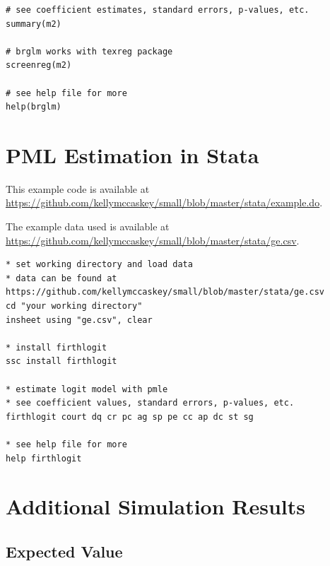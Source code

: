 \documentclass[12pt]{article}
\begin{document}
\begin{appendix}
\begin{footnotesize}
\begin{verbatim}
# see coefficient estimates, standard errors, p-values, etc.
summary(m2)

# brglm works with texreg package
screenreg(m2)

# see help file for more
help(brglm)
\end{verbatim}
\end{footnotesize}

\section{PML Estimation in Stata}\label{sec:pmle-in-stata}

This example code is available at \href{https://github.com/kellymccaskey/small/blob/master/stata/example.do}{https://github.com/kellymccaskey/small/blob/master/stata/example.do}.

\noindent The example data used is available at \href{https://github.com/kellymccaskey/small/blob/master/stata/GE.dta}{https://github.com/kellymccaskey/small/blob/master/stata/ge.csv}.

\begin{footnotesize}
\begin{verbatim}
* set working directory and load data
* data can be found at https://github.com/kellymccaskey/small/blob/master/stata/ge.csv
cd "your working directory"
insheet using "ge.csv", clear

* install firthlogit
ssc install firthlogit

* estimate logit model with pmle
* see coefficient values, standard errors, p-values, etc.
firthlogit court dq cr pc ag sp pe cc ap dc st sg

* see help file for more
help firthlogit

\end{verbatim}
\end{footnotesize}


\section{Additional Simulation Results}\label{sec:app-sims}

\subsection{Expected Value}


\end{appendix}
\end{document}
